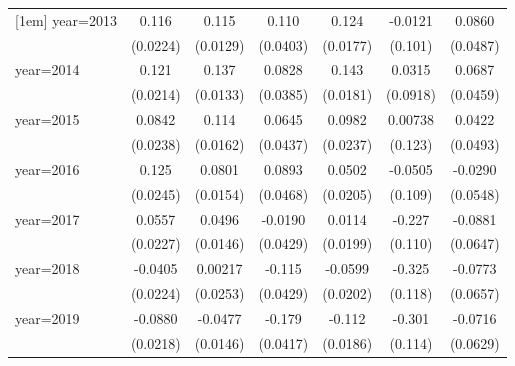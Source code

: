 \begin{table}[htbp]
\begin{tabular}{l*{6}{c}}
[1em]
year=2013           &       0.116\sym{***}&       0.115\sym{***}&       0.110\sym{***}&       0.124\sym{***}&     -0.0121         &      0.0860\sym{*}  \\
                    &    (0.0224)         &    (0.0129)         &    (0.0403)         &    (0.0177)         &     (0.101)         &    (0.0487)         \\
[1em]
year=2014           &       0.121\sym{***}&       0.137\sym{***}&      0.0828\sym{**} &       0.143\sym{***}&      0.0315         &      0.0687         \\
                    &    (0.0214)         &    (0.0133)         &    (0.0385)         &    (0.0181)         &    (0.0918)         &    (0.0459)         \\
[1em]
year=2015           &      0.0842\sym{***}&       0.114\sym{***}&      0.0645         &      0.0982\sym{***}&     0.00738         &      0.0422         \\
                    &    (0.0238)         &    (0.0162)         &    (0.0437)         &    (0.0237)         &     (0.123)         &    (0.0493)         \\
[1em]
year=2016           &       0.125\sym{***}&      0.0801\sym{***}&      0.0893\sym{*}  &      0.0502\sym{**} &     -0.0505         &     -0.0290         \\
                    &    (0.0245)         &    (0.0154)         &    (0.0468)         &    (0.0205)         &     (0.109)         &    (0.0548)         \\
[1em]
year=2017           &      0.0557\sym{**} &      0.0496\sym{***}&     -0.0190         &      0.0114         &      -0.227\sym{**} &     -0.0881         \\
                    &    (0.0227)         &    (0.0146)         &    (0.0429)         &    (0.0199)         &     (0.110)         &    (0.0647)         \\
[1em]
year=2018           &     -0.0405\sym{*}  &     0.00217         &      -0.115\sym{***}&     -0.0599\sym{***}&      -0.325\sym{***}&     -0.0773         \\
                    &    (0.0224)         &    (0.0253)         &    (0.0429)         &    (0.0202)         &     (0.118)         &    (0.0657)         \\
[1em]
year=2019           &     -0.0880\sym{***}&     -0.0477\sym{***}&      -0.179\sym{***}&      -0.112\sym{***}&      -0.301\sym{***}&     -0.0716         \\
                    &    (0.0218)         &    (0.0146)         &    (0.0417)         &    (0.0186)         &     (0.114)         &    (0.0629)         \\

\end{tabular}
\end{table}
